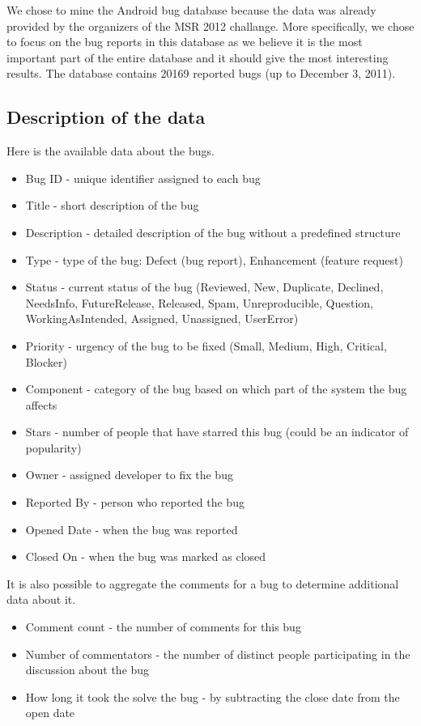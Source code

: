 
We chose to mine the Android bug database because the data was already provided by the organizers of the MSR 2012 challange. More specifically, we chose to focus on the bug reports in this database as we believe it is the most important part of the entire database and it should give the most interesting results. The database contains 20169 reported bugs (up to December 3, 2011). 

\subsection*{Description of the data} %
\label{sub:Description of the data}

Here is the available data about the bugs.

\begin{itemize}
\item Bug ID - unique identifier assigned to each bug
\item Title - short description of the bug
\item Description - detailed description of the bug without a predefined structure
\item Type - type of the bug: Defect (bug report), Enhancement (feature request)
\item Status - current status of the bug (Reviewed, New, Duplicate, Declined, NeedsInfo, FutureRelease, Released, Spam, Unreproducible, Question, WorkingAsIntended, Assigned, Unassigned, UserError)
\item Priority - urgency of the bug to be fixed (Small, Medium, High, Critical, Blocker)
\item Component - category of the bug based on which part of the system the bug affects
\item Stars - number of people that have starred this bug (could be an indicator of popularity)
\item Owner - assigned developer to fix  the bug
\item Reported By - person who reported the bug
\item Opened Date - when the bug was reported
\item Closed On - when the bug was marked as closed
\end{itemize}

It is also possible to aggregate the comments for a bug to determine additional data about it.

\begin{itemize}
\item Comment count - the number of comments for this bug
\item Number of commentators - the number of distinct people participating in the discussion about the bug
\item How long it took the solve the bug - by subtracting the close date from the open date
\end{itemize}

